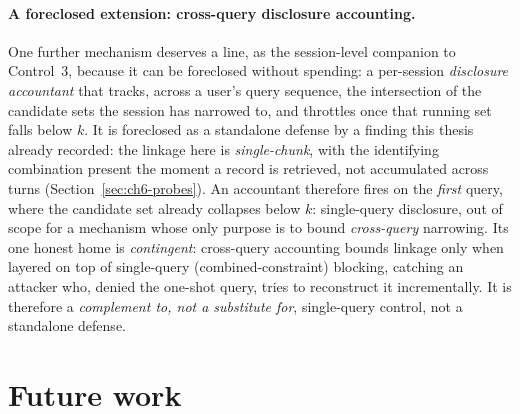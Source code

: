 \documentclass[12pt,a4paper]{report}
\begin{document}
\paragraph{A foreclosed extension: cross-query disclosure accounting.} One further mechanism deserves a
line, as the session-level companion to Control~3, because it can be foreclosed without spending: a
per-session \emph{disclosure accountant} that tracks, across a user's query sequence, the intersection of
the candidate sets the session has narrowed to, and throttles once that running set falls below $k$. It is
foreclosed as a standalone defense by a finding this thesis already recorded: the linkage here is
\emph{single-chunk}, with the identifying combination present the moment a record is retrieved, not
accumulated across turns (Section~\ref{sec:ch6-probes}). An accountant therefore fires on the \emph{first}
query, where the candidate set already collapses below $k$: single-query disclosure, out of scope for a
mechanism whose only purpose is to bound \emph{cross-query} narrowing. Its one honest home is
\emph{contingent}: cross-query accounting bounds linkage only when layered on top of single-query
(combined-constraint) blocking, catching an attacker who, denied the one-shot query, tries to reconstruct
it incrementally. It is therefore a \emph{complement to, not a substitute for}, single-query control, not a
standalone defense.

\section{Future work}
\label{sec:disc-future}
\end{document}

